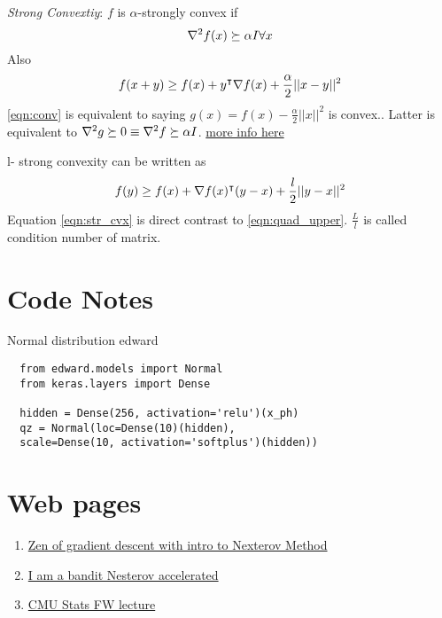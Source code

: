   \emph{Strong Convextiy}: $f$ is $\alpha$-strongly convex if 
  $$\nabla^2f(x) \succeq \alpha I \forall x$$
  Also
  \begin{equation} \label{eqn:conv}
    f(x + y) \geq f(x) + y^\intercal \nabla f(x) + \frac{\alpha}{2}||x-y||^2
  \end{equation}
  \ref{eqn:conv} is equivalent to saying $g(x) = f(x) - \frac{\alpha}{2}||x||^2$
  is convex.. Latter is equivalent to $\nabla^2 g \succeq 0 \equiv \nabla^2 f \succeq \alpha I$.
  \href{https://math.stackexchange.com/questions/673898/lipschitz-smoothness-strong-convexity-and-the-hessian}
  {more info here} 

  l- strong convexity can be written as 
  \begin{equation}
    \label{eqn:str_cvx}
    f(y) \geq f(x) + \nabla f(x)^\intercal (y-x) + \frac{l}{2}||y-x||^2
  \end{equation}
  Equation \ref{eqn:str_cvx} is direct contrast to \ref{eqn:quad_upper}. 
  $\frac{L}{l}$ is called condition number of matrix.

  \newpage
  \section{Code Notes}
  Normal distribution edward

  \begin{verbatim}
  from edward.models import Normal
  from keras.layers import Dense
  
  hidden = Dense(256, activation='relu')(x_ph)
  qz = Normal(loc=Dense(10)(hidden),
  scale=Dense(10, activation='softplus')(hidden))
  \end{verbatim}

  \section{Web pages}
  \begin{enumerate}
    \item \href{http://blog.mrtz.org/2013/09/07/the-zen-of-gradient-descent.html}
  {Zen of gradient descent with intro to Nexterov Method}  \\
    \item \href{https://blogs.princeton.edu/imabandit/2013/04/01/acceleratedgradientdescent/}
  {I am a bandit Nesterov accelerated} 
    \item \href{http://www.stat.cmu.edu/~ryantibs/convexopt-S15/scribes/23-cond-grad-scribed.pdf}
  {CMU Stats FW lecture} \label{web:cmu}
  \end{enumerate}



